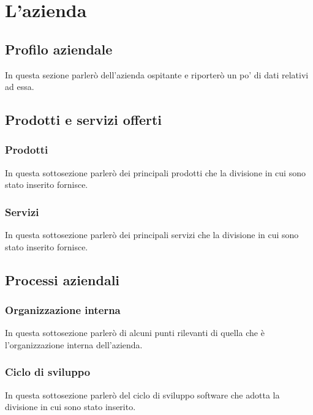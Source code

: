 
\chapter{L'azienda}

\section{Profilo aziendale}
In questa sezione parlerò dell'azienda ospitante e riporterò un po' di dati relativi ad essa.

\section{Prodotti e servizi offerti}
	
\subsection{Prodotti}
In questa sottosezione parlerò dei principali prodotti che la divisione in cui sono stato inserito fornisce.
	
\subsection{Servizi}
In questa sottosezione parlerò dei principali servizi che la divisione in cui sono stato inserito fornisce.
	
\section{Processi aziendali}

\subsection{Organizzazione interna}
In questa sottosezione parlerò di alcuni punti rilevanti di quella che è l'organizzazione interna dell'azienda.
	
\subsection{Ciclo di sviluppo}
In questa sottosezione parlerò del ciclo di sviluppo software che adotta la divisione in cui sono stato inserito.
	
